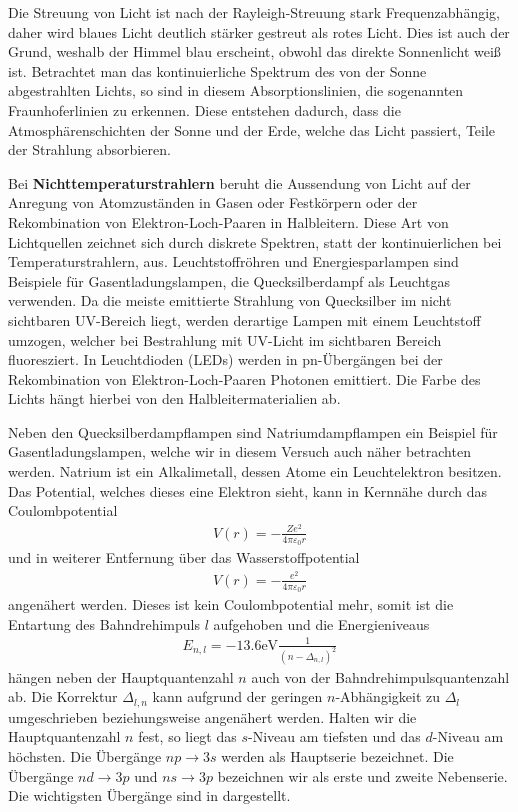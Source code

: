 Die Streuung von Licht ist nach der Rayleigh-Streuung stark Frequenzabhängig, daher wird blaues Licht deutlich stärker gestreut als rotes Licht. Dies ist auch der Grund, weshalb der Himmel blau erscheint, obwohl das direkte Sonnenlicht weiß ist. Betrachtet man das kontinuierliche Spektrum des von der Sonne abgestrahlten Lichts, so sind in diesem Absorptionslinien, die sogenannten Fraunhoferlinien zu erkennen. Diese entstehen dadurch, dass die Atmosphärenschichten der Sonne und der Erde, welche das Licht passiert, Teile der Strahlung absorbieren.
 
Bei \textbf{Nichttemperaturstrahlern} beruht die Aussendung von Licht auf der Anregung von Atomzuständen in Gasen oder Festkörpern oder der Rekombination von Elektron-Loch-Paaren in Halbleitern. Diese Art von Lichtquellen zeichnet sich durch diskrete Spektren, statt der kontinuierlichen bei Temperaturstrahlern, aus. Leuchtstoffröhren und Energiesparlampen sind Beispiele für Gasentladungslampen, die Quecksilberdampf als Leuchtgas verwenden. Da die meiste emittierte Strahlung von Quecksilber im nicht sichtbaren UV-Bereich liegt, werden derartige Lampen mit einem Leuchtstoff umzogen, welcher bei Bestrahlung mit UV-Licht im sichtbaren Bereich fluoresziert. In Leuchtdioden (LEDs) werden in pn-Übergängen bei der Rekombination von Elektron-Loch-Paaren Photonen emittiert. Die Farbe des Lichts hängt hierbei von den Halbleitermaterialien ab.

Neben den Quecksilberdampflampen sind Natriumdampflampen ein Beispiel für Gasentladungslampen, welche wir in diesem Versuch auch näher betrachten werden. Natrium ist ein Alkalimetall, dessen Atome ein Leuchtelektron besitzen. Das Potential, welches dieses eine Elektron \glqq{}sieht\grqq{}, kann in Kernnähe durch das Coulombpotential
\begin{align}
  V(r) = -\frac{Ze^2}{4 \pi \varepsilon_0 r}
\end{align}
und in weiterer Entfernung über das Wasserstoffpotential
\begin{align}
  V(r) = -\frac{e^2}{4 \pi \varepsilon_0 r}
\end{align}
angenähert werden. Dieses ist kein Coulombpotential mehr, somit ist die Entartung des Bahndrehimpuls $l$ aufgehoben und die Energieniveaus 
\begin{align}
  E_{n,l} = -13.6\si{\electronvolt} \frac{1}{(n - \Delta_{n,l})^2}
\end{align}
hängen neben der Hauptquantenzahl $n$ auch von der Bahndrehimpulsquantenzahl ab. Die Korrektur $\Delta_{l,n}$ kann aufgrund der geringen $n$-Abhängigkeit zu $\Delta_{l}$ umgeschrieben beziehungsweise angenähert werden. Halten wir die Hauptquantenzahl $n$ fest, so liegt das $s$-Niveau am tiefsten und das $d$-Niveau am höchsten. Die Übergänge $np\to3s$ werden als Hauptserie bezeichnet. Die Übergänge $nd\to3p$ und $ns\to3p$ bezeichnen wir als erste und zweite Nebenserie. Die wichtigsten Übergänge sind in  dargestellt.

